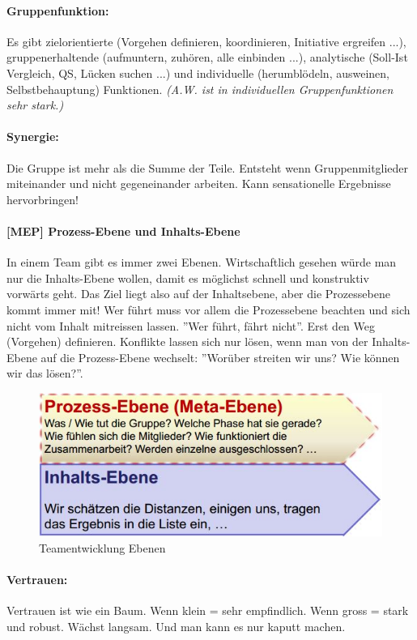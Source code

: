 \paragraph{Gruppenfunktion:} Es gibt zielorientierte (Vorgehen definieren, koordinieren, Initiative ergreifen ...), gruppenerhaltende (aufmuntern, zuhören, alle einbinden ...), analytische (Soll-Ist Vergleich, QS, Lücken suchen ...) und individuelle (herumblödeln, ausweinen, Selbstbehauptung) Funktionen. \textit{(A.W. ist in individuellen Gruppenfunktionen sehr stark.)}

\paragraph{Synergie:} Die Gruppe ist mehr als die Summe der Teile. Entsteht wenn Gruppenmitglieder miteinander und nicht gegeneinander arbeiten. Kann sensationelle Ergebnisse hervorbringen!

\paragraph{[MEP] Prozess-Ebene und Inhalts-Ebene} In einem Team gibt es immer zwei Ebenen. Wirtschaftlich gesehen würde man nur die Inhalts-Ebene wollen, damit es möglichst schnell und konstruktiv vorwärts geht. Das Ziel liegt also auf der Inhaltsebene, aber die Prozessebene kommt immer mit! Wer führt muss vor allem die Prozessebene beachten und sich nicht vom Inhalt mitreissen lassen. ''Wer führt, fährt nicht''. Erst den Weg (Vorgehen) definieren. Konflikte lassen sich nur lösen, wenn man von der Inhalts-Ebene auf die Prozess-Ebene wechselt: ''Worüber streiten wir uns? Wie können wir das lösen?''.

\begin{figure}[h!]
\centering
\includegraphics[width=0.5\linewidth]{fig/teamentwicklung-metaebene}
\caption{Teamentwicklung Ebenen}
\label{fig:teamentwicklung-metaebene}
\end{figure}

\paragraph{Vertrauen:} Vertrauen ist wie ein Baum. Wenn klein = sehr empfindlich. Wenn gross = stark und robust. Wächst langsam. Und man kann es nur kaputt machen.


